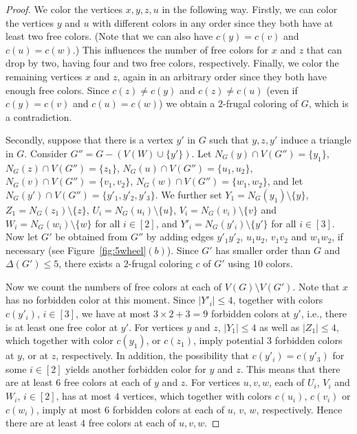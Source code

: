 \documentclass[11pt]{article}
\begin{document}
\begin{proof}
We color the vertices $x,y,z,u$ in the following way. Firstly, we can color the vertices $y$ and $u$ with different colors in any order since they both have at least two free colors. (Note that we can also have $c(y)=c(v)$ and $c(u)=c(w)$.) This influences the number of free colors for $x$ and $z$ that can drop by two, having four and two free colors, respectively. Finally, we color the remaining vertices $x$ and $z$, again in an arbitrary order since they both have enough free colors. Since $c(z) \ne c(y)$ and $c(z) \ne c(u)$ (even if $c(y)=c(v)$ and $c(u)=c(w)$) we obtain a $2$-frugal coloring of $G$, which is a contradiction.

\medskip

Secondly, suppose that there is a vertex $y'$ in $G$ such that $y,z,y'$ induce a triangle in $G$. Consider $G''=G-(V(W)\cup \{y'\})$. Let $N_G(y) \cap V(G'')=\{y_1\}$, $N_G(z) \cap V(G'')=\{z_1\}$, $N_G(u) \cap V(G'')=\{u_1,u_2\}$, $N_G(v) \cap V(G'')=\{v_1,v_2\}$,  $N_G(w) \cap V(G'')=\{w_1,w_2\}$, and let $N_G(y') \cap V(G'')=\{y'_1,y'_2,y'_3\}$. We further set $Y_1=N_G(y_1)\setminus\{y\}$, $Z_1=N_G(z_1)\setminus\{z\}$,
$U_i=N_G(u_i)\setminus\{u\}$, $V_i=N_G(v_i)\setminus\{v\}$ and $W_i=N_G(w_i)\setminus\{w\}$ for all $i\in[2]$, and $Y'_i=N_G(y'_i)\setminus\{y'\}$  for all $i \in [3]$. Now let $G'$ be obtained from $G''$ by adding edges $y'_1y'_2$, $u_1u_2$, $v_1v_2$ and $w_1w_2$, if necessary (see Figure~\ref{fig:5wheel}$(b)$).  Since $G'$ has smaller order than $G$ and $\Delta(G') \le 5$, there exists a $2$-frugal coloring $c$ of $G'$ using $10$ colors. 

Now we count the numbers of free colors at each of $V(G)\setminus V(G')$. Note that $x$ has no forbidden color at this moment. Since $\vert Y'_i\vert \le 4$, together with colors $c(y'_i)$, $i\in [3]$, we have at most $3 \times 2+3=9$ forbidden colors at $y'$, i.e., there is at least one free color at $y'$. For vertices $y$ and $z$, $\vert Y_1\vert \le 4$ as well as $\vert Z_1 \vert \leq 4$, which together with color $c(y_1)$, or $c(z_1)$, imply potential $3$ forbidden colors at $y$, or at $z$, respectively. In addition, the possibility that $c(y'_i)=c(y'_3)$ for some $i\in [2]$ yields another forbidden color for $y$ and $z$. 
This means that there are at least $6$ free colors at each of $y$ and $z$. For vertices $u,v,w$, each of $U_i$, $V_i$ and $W_i$, $i\in [2]$, has at most $4$ vertices, which together with colors $c(u_i)$, $c(v_i)$ or $c(w_i)$, imply at most $6$ forbidden colors at each of $u$, $v$, $w$, respectively. Hence there are at least $4$ free colors at each of $u,v,w$.


\end{proof}
\end{document}
